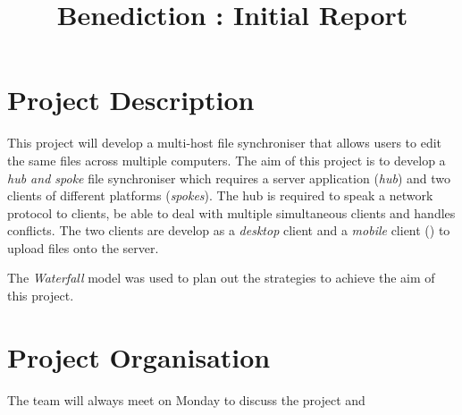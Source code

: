 \documentclass[11pt]{article}
\begin{document}
\title{Benediction : Initial Report}
\maketitle

\section*{Project Description}
This project will develop a multi-host file synchroniser that allows users to edit the same files across multiple computers. The aim of this project is to develop a \emph{hub and spoke} file synchroniser which requires a server application (\emph{hub}) and two clients of different platforms (\emph{spokes}). The hub is required to speak a network protocol to clients, be able to deal with multiple simultaneous clients and handles conflicts. The two clients are develop as a \emph{desktop} client and a \emph{mobile} client () to upload files onto the server.

The \emph{Waterfall} model was used to plan out the strategies to achieve the aim of this project. 

\section*{Project Organisation}

The team will always meet on Monday to discuss the project and
\end{document}
